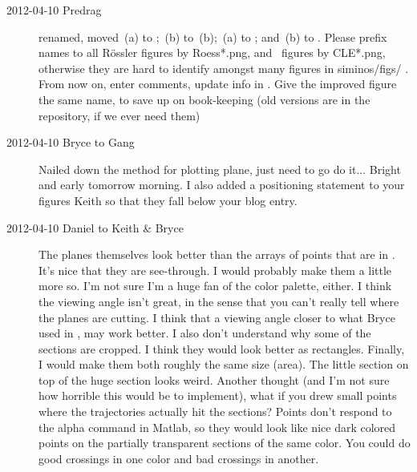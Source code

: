 \begin{description}
\item[2012-04-10  Predrag] renamed, moved
\,(a) to ;
\,(b) to \,(b);
\,(a) to  ; and
\,(b) to  .
Please prefix names to all R\"ossler figures by Roess*.png, and \cLe\ figures
by CLE*.png, otherwise they are hard to identify amongst many figures in
siminos/figs/ . From now on, enter comments, update info in
. Give the improved figure the same name, to save up
on book-keeping (old versions are in the repository, if we ever need
them)

\item[2012-04-10 Bryce to Gang]
Nailed down the method for plotting plane, just need to go do it...
Bright and early tomorrow morning. I also added a positioning statement
to your figures Keith so that they fall below your blog entry.


\item[2012-04-10 Daniel to Keith \& Bryce] The planes themselves look
better than the arrays of points that are in . It's
nice that they are see-through. I would probably make them a little more
so. I'm not sure I'm a huge fan of the color palette, either. I think the
viewing angle isn't great, in the sense that you can't really tell where
the planes are cutting. I think that a viewing angle closer to what Bryce
used in , may work better. I also don't understand
why some of the sections are cropped. I think they would look better as
rectangles. Finally, I would make them both roughly the same size (area).
The little section on top of the huge section looks weird. Another
thought (and I'm not sure how horrible this would be to implement), what
if you drew small points where the trajectories actually hit the
sections? Points don't respond to the alpha command in Matlab, so they
would look like nice dark colored points on the partially transparent
sections of the same color. You could do good crossings in one color and
bad crossings in another.


\end{description}
